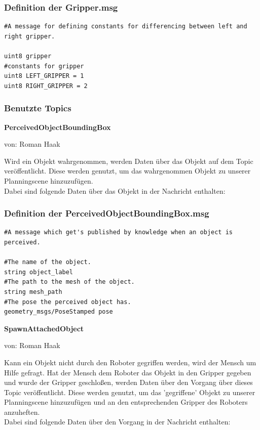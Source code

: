 \documentclass{suturo}
\makeatletter
\newcommand{\chapterauthor}[1]{%
  {\parindent0pt\vspace*{-27pt}%
  \linespread{0}\small\begin{flushright}von: #1\end{flushright}%
  \par\nobreak\vspace*{0pt}}
  \@afterheading%
}
\makeatother
\begin{document}
\subsubsection*{Definition der Gripper.msg}
\begin{verbatim}
#A message for defining constants for differencing between left and right gripper.

uint8 gripper
#constants for gripper
uint8 LEFT_GRIPPER = 1
uint8 RIGHT_GRIPPER = 2
\end{verbatim}

\newpage

\subsubsection{Benutzte Topics}
\textbf{PerceivedObjectBoundingBox}
\chapterauthor{Roman Haak}

Wird ein Objekt wahrgenommen, werden Daten über das Objekt auf dem Topic veröffentlicht. Diese werden genutzt, um das wahrgenommen Objekt zu unserer Planningscene hinzuzufügen.\\ Dabei sind folgende Daten über das Objekt in der Nachricht enthalten: \\

\subsubsection*{Definition der PerceivedObjectBoundingBox.msg}
\begin{verbatim}
#A message which get's published by knowledge when an object is perceived.

#The name of the object.
string object_label
#The path to the mesh of the object.
string mesh_path
#The pose the perceived object has.
geometry_msgs/PoseStamped pose
\end{verbatim}


\textbf{SpawnAttachedObject}
\chapterauthor{Roman Haak}

Kann ein Objekt nicht durch den Roboter gegriffen werden, wird der Mensch um Hilfe gefragt. Hat der Mensch dem Roboter das Objekt in den Gripper gegeben und wurde der Gripper geschloßen, werden Daten über den Vorgang über dieses Topic veröffentlicht. Diese werden genutzt, um das 'gegriffene' Objekt zu unserer Planningscene hinzuzufügen und an den entsprechenden Gripper des Roboters anzuheften.\\ Dabei sind folgende Daten über den Vorgang in der Nachricht enthalten: \\
\end{document}
